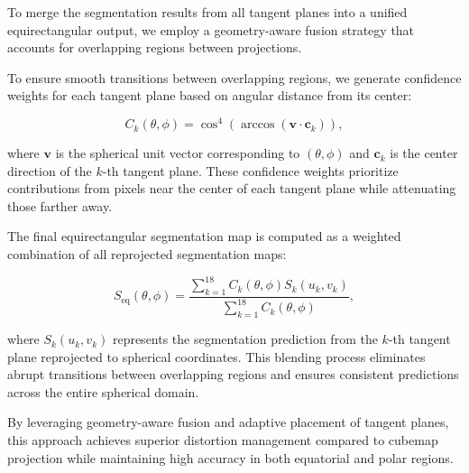 To merge the segmentation results from all tangent planes into a unified equirectangular output, we employ a geometry-aware fusion strategy that accounts for overlapping regions between projections. 


To ensure smooth transitions between overlapping regions, we generate confidence weights for each tangent plane based on angular distance from its center:

\begin{equation}
C_k(\theta,\phi) = \cos^4(\arccos(\mathbf{v} \cdot \mathbf{c}_k)),
\end{equation}

where $\mathbf{v}$ is the spherical unit vector corresponding to $(\theta,\phi)$ and $\mathbf{c}_k$ is the center direction of the $k$-th tangent plane. These confidence weights prioritize contributions from pixels near the center of each tangent plane while attenuating those farther away.

The final equirectangular segmentation map is computed as a weighted combination of all reprojected segmentation maps:

\begin{equation}
S_{\text{eq}}(\theta,\phi) = \frac{\sum_{k=1}^{18} C_k(\theta,\phi) S_k(u_k,v_k)}{\sum_{k=1}^{18} C_k(\theta,\phi)},
\end{equation}

where $S_k(u_k,v_k)$ represents the segmentation prediction from the $k$-th tangent plane reprojected to spherical coordinates. This blending process eliminates abrupt transitions between overlapping regions and ensures consistent predictions across the entire spherical domain.

By leveraging geometry-aware fusion and adaptive placement of tangent planes, this approach achieves superior distortion management compared to cubemap projection while maintaining high accuracy in both equatorial and polar regions.

